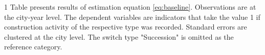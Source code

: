 \begin{table}[htbp]
   \par \raggedright 
   1 Table presents results of estimation equation \ref{eq:baseline}. 
     Observations are at the city-year level. The dependent variables are indicators
     that take the value 1 if construction activity of the respective type was
     recorded. Standard errors are clustered at the city level. The switch type 
     "Succession" is omitted as the reference category.
\end{table}

